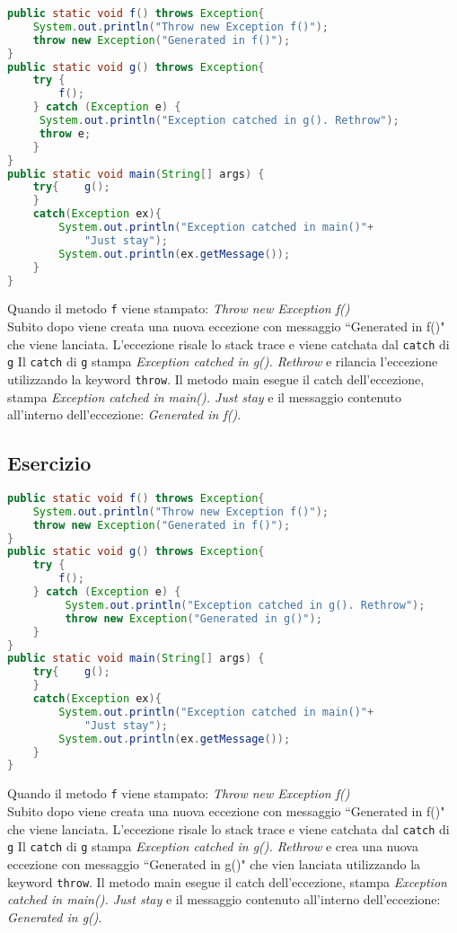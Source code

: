 \documentclass{article}
\begin{document}
\begin{lstlisting}[language=Java]
public static void f() throws Exception{
    System.out.println("Throw new Exception f()");
    throw new Exception("Generated in f()");
}
public static void g() throws Exception{
    try {
        f();
    } catch (Exception e) {
     System.out.println("Exception catched in g(). Rethrow");
     throw e;
    }
}
public static void main(String[] args) {
    try{    g();
    }
    catch(Exception ex){
        System.out.println("Exception catched in main()"+
            "Just stay");
        System.out.println(ex.getMessage());
    }
}
\end{lstlisting}

Quando il metodo \texttt{f} viene stampato: \textit{Throw new Exception f()}\\
Subito dopo viene creata una nuova eccezione con messaggio ``Generated in f()"  che viene lanciata. L'eccezione risale lo stack trace e viene catchata dal \texttt{catch} di \texttt{g} 
Il \texttt{catch} di \texttt{g} stampa \textit{Exception catched in g(). Rethrow} e rilancia l'eccezione utilizzando la keyword \texttt{throw}.
Il metodo main esegue il catch dell'eccezione, stampa \textit{Exception catched in main(). Just stay} e il messaggio contenuto all'interno dell'eccezione: \textit{Generated in f()}.

\subsection{Esercizio}

\begin{lstlisting}[language=Java]
public static void f() throws Exception{
    System.out.println("Throw new Exception f()");
    throw new Exception("Generated in f()");
}
public static void g() throws Exception{
    try {
        f();
    } catch (Exception e) {
         System.out.println("Exception catched in g(). Rethrow");
         throw new Exception("Generated in g()");
    }
}
public static void main(String[] args) {
    try{    g();
    }
    catch(Exception ex){
        System.out.println("Exception catched in main()"+
            "Just stay");
        System.out.println(ex.getMessage());
    }
}
\end{lstlisting}
Quando il metodo \texttt{f} viene stampato: \textit{Throw new Exception f()}\\
Subito dopo viene creata una nuova eccezione con messaggio ``Generated in f()"  che viene lanciata. L'eccezione risale lo stack trace e viene catchata dal \texttt{catch} di \texttt{g} 
Il \texttt{catch} di \texttt{g} stampa \textit{Exception catched in g(). Rethrow} e crea una nuova eccezione con messaggio ``Generated in g()" che vien lanciata utilizzando la keyword \texttt{throw}.
Il metodo main esegue il catch dell'eccezione, stampa \textit{Exception catched in main(). Just stay} e il messaggio contenuto all'interno dell'eccezione: \textit{Generated in g()}.
\end{document}
